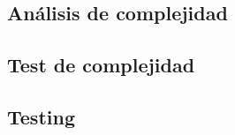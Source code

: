 \subsection{An\'alisis de complejidad}


\subsection{Test de complejidad}

\subsection{Testing}































